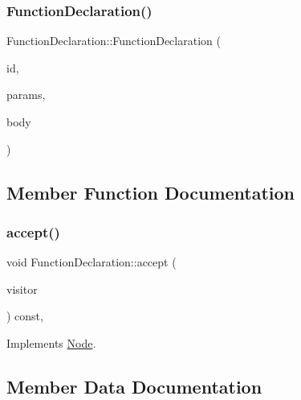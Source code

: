 \subsubsection{\texorpdfstring{Function\+Declaration()}{FunctionDeclaration()}}
{\footnotesize\ttfamily Function\+Declaration\+::\+Function\+Declaration (\begin{DoxyParamCaption}\item[{\hyperlink{struct_identifier}{Identifier} $\ast$}]{id,  }\item[{\hyperlink{struct_formal_parameter_list}{Formal\+Parameter\+List} $\ast$}]{params,  }\item[{\hyperlink{struct_function_body}{Function\+Body} $\ast$}]{body }\end{DoxyParamCaption})\hspace{0.3cm}{\ttfamily [inline]}}



\subsection{Member Function Documentation}
\mbox{\label{struct_function_declaration_a879cc374076bebe3609f66306d6a638d}} 
\subsubsection{\texorpdfstring{accept()}{accept()}}
{\footnotesize\ttfamily void Function\+Declaration\+::accept (\begin{DoxyParamCaption}\item[{\hyperlink{struct_visitor}{Visitor} \&}]{visitor }\end{DoxyParamCaption}) const\hspace{0.3cm}{\ttfamily [inline]}, {\ttfamily [virtual]}}



Implements \hyperlink{struct_node_a10bd7af968140bbf5fa461298a969c71}{Node}.



\subsection{Member Data Documentation}
\mbox{\label{struct_function_declaration_ae35697bf8c8a45e490fa352d77a0c19b}} 
